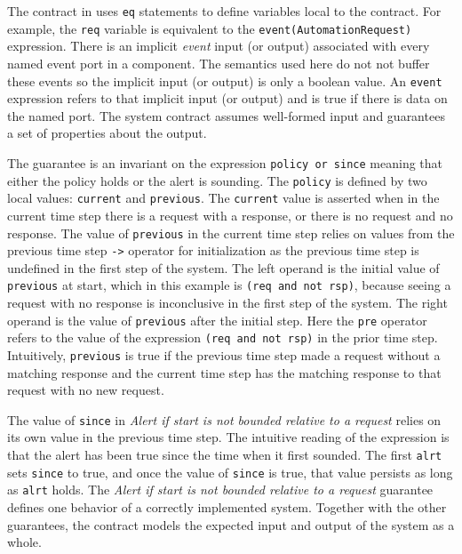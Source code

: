 The contract in  uses \texttt{eq} statements to define variables local to the contract. For example, the \texttt{req} variable is equivalent to the \texttt{event(AutomationRequest)} expression. There is an implicit \emph{event} input (or output) associated with every named event port in a component. The semantics used here do not not buffer these events so the implicit input (or output) is only a boolean value. An \texttt{event} expression refers to that implicit input (or output) and is true if there is data on the named port. The system contract assumes well-formed input and guarantees a set of properties about the output.

The guarantee is an invariant on the expression \texttt{policy or since} meaning that either the policy holds or the alert is sounding. The \texttt{policy} is defined by two local values: \texttt{current} and \texttt{previous}. The \texttt{current} value is asserted when in the current time step there is a request with a response, or there is no request and no response.  The value of \texttt{previous} in the current time step relies on values from the previous time step \texttt{->} operator for initialization as the previous time step is undefined in the first step of the system. The left operand is the initial value of \texttt{previous} at start, which in this example is \texttt{(req and not rsp)}, because seeing a request with no response is inconclusive in the first step of the system. The right operand is the value of \texttt{previous} after the initial step. Here the \texttt{pre} operator refers to the value of the expression \texttt{(req and not rsp)} in the prior time step. Intuitively, \texttt{previous} is true if the previous time step made a request without a matching response and the current time step has the matching response to that request with no new request.

The value of \texttt{since} in \emph{Alert if start is not bounded relative to a request} relies on its own value in the previous time step. The intuitive reading of the expression is that the alert has been true since the time when it first sounded. The first \texttt{alrt} sets \texttt{since} to true, and once the value of \texttt{since} is true, that value persists as long as \texttt{alrt} holds. The \emph{Alert if start is not bounded relative to a request} guarantee defines one behavior of a correctly implemented system. Together with the other guarantees, the contract models the expected input and output of the system as a whole.

